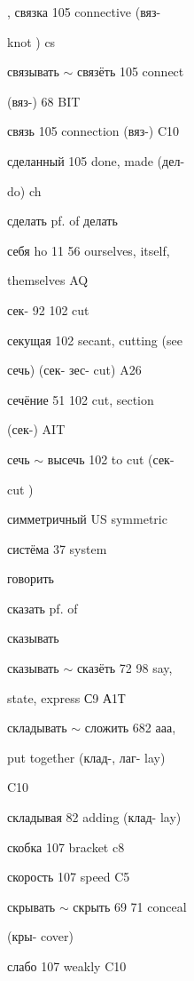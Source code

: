 \begin{minipage}[t]{0.475\textwidth}
\raggedright
\noindent , связка 105 connective (вяз-\par
\noindent knot ) cs\par
\noindent связывать $\sim$ связёть 105 connect\par
\noindent (вяз-) 68 BIT\par
\noindent связь 105 connection (вяз-) C10\par
\noindent сделанный 105 done, made (дел-\par
\noindent do) ch\par
\noindent сделать pf. of делать\par
\noindent себя ho 11 56 ourselves, itself,\par
\noindent themselves AQ\par
\noindent сек- 92 102 cut\par
\noindent секущая 102 secant, cutting (see\par
\noindent сечь) (сек- зес- cut) A26\par
\noindent сечёние 51 102 cut, section\par
\noindent (сек-) AIT\par
\noindent сечь $\sim$ высечь 102 to cut (сек-\par
\noindent cut )\par
\noindent симметричный US symmetric\par
\noindent систёма 37 system\par
\noindent говорить\par
\noindent сказать pf. of\par
\noindent сказывать\par
\noindent сказывать $\sim$ сказёть 72 98 say,\par
\noindent state, express С9 А1Т\par
\noindent складывать $\sim$ сложить 682 ааа,\par
\noindent put together (клад-, лаг- lay)\par
\noindent C10\par
\noindent складывая 82 adding (клад- lay)\par
\noindent скобка 107 bracket c8\par
\noindent скорость 107 speed C5\par
\noindent скрывать $\sim$ скрыть 69 71 conceal\par
\noindent (кры- cover)\par
\noindent слабо 107 weakly C10\par

\end{minipage}
